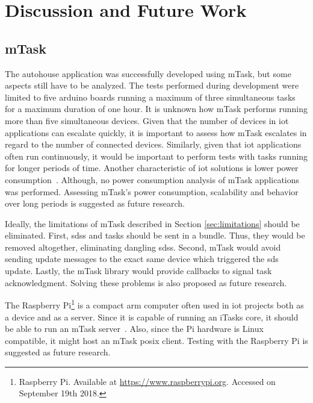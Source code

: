 \section{Discussion and Future Work}

\subsection{mTask}

The \gls{autohouse} application was successfully developed using \gls{mTask}, but some aspects still have to be analyzed. The tests performed during development were limited to five \gls{arduino} boards running a maximum of three simultaneous tasks for a maximum duration of one hour. It is unknown how \gls{mTask} performs running more than five simultaneous devices. Given that the number of devices in \acs{iot} applications can escalate quickly, it is important to assess how \gls{mTask} escalates in regard to the number of connected devices. Similarly, given that \acs{iot} applications often run continuously, it would be important to perform tests with tasks running for longer periods of time. Another characteristic of \acs{iot} solutions is lower power consumption~\cite{survey,survey2,survey3}. Although, no power consumption analysis of \gls{mTask} applications was performed. Assessing \gls{mTask}'s power consumption, scalability and behavior over long periods is suggested as future research. 

Ideally, the limitations of \gls{mTask} described in Section \ref{sec:limitations} should be eliminated. First, \acsp{sds} and tasks should be sent in a bundle. Thus, they would be removed altogether, eliminating dangling \acsp{sds}. Second, \gls{mTask} would avoid sending update messages to the exact same device which triggered the \acs{sds} update. Lastly, the \gls{mTask} library would provide callbacks to signal task acknowledgment. Solving these problems is also proposed as future research.

The Raspberry Pi\footnote{Raspberry Pi. Available at \url{https://www.raspberrypi.org}. Accessed on September 19th 2018.} is a compact \acs{arm} computer often used in \acs{iot} projects both as a device and as a server. Since it is capable of running an \gls{iTasks} core, it should be able to run an \gls{mTask} server~\cite{distributed}. Also, since the Pi hardware is Linux compatible, it might host an \gls{mTask} \acs{posix} client. Testing with the Raspberry Pi is suggested as future research.

